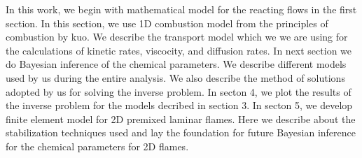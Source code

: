 \bigskip
\noindent In this work, we begin with mathematical model for the reacting flows in the first section. In this section, we use 1D combustion model from the principles of combustion by kuo. We describe the transport model which we we are using for the calculations of kinetic rates, viscocity, and diffusion rates. In next section we do Bayesian inference of the chemical parameters. We describe different models used by us during the entire analysis. We also describe the method of solutions adopted by us for solving the inverse problem. In secton 4, we plot the results of the inverse problem for the models decribed in section 3. In secton 5, we develop finite element model for 2D premixed laminar flames. Here we describe about the stabilization techniques used and lay the foundation for future Bayesian inference for the chemical parameters for 2D flames.  


